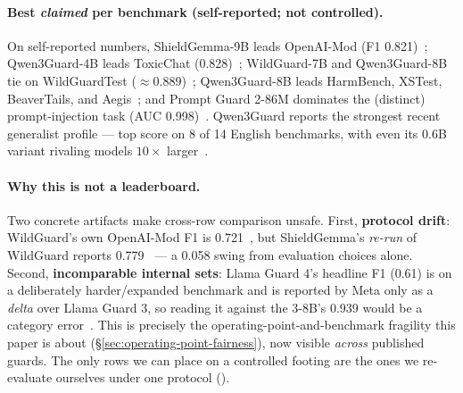 \paragraph{Best \emph{claimed} per benchmark (self-reported; not controlled).}
On self-reported numbers, ShieldGemma-9B leads OpenAI-Mod (F1 0.821)~\cite{zeng2024shieldgemma}; Qwen3Guard-4B leads ToxicChat (0.828)~\cite{qwen3guard2025}; WildGuard-7B and Qwen3Guard-8B tie on WildGuardTest ($\approx$0.889)~\cite{han2024wildguard,qwen3guard2025}; Qwen3Guard-8B leads HarmBench, XSTest, BeaverTails, and Aegis~\cite{qwen3guard2025}; and Prompt Guard 2-86M dominates the (distinct) prompt-injection task (AUC 0.998)~\cite{meta2025promptguard2}. Qwen3Guard reports the strongest recent generalist profile --- top score on 8 of 14 English benchmarks, with even its 0.6B variant rivaling models $10\times$ larger~\cite{qwen3guard2025}.

\paragraph{Why this is not a leaderboard.}
Two concrete artifacts make cross-row comparison unsafe. First, \textbf{protocol drift}: WildGuard's own OpenAI-Mod F1 is 0.721~\cite{han2024wildguard}, but ShieldGemma's \emph{re-run} of WildGuard reports 0.779~\cite{zeng2024shieldgemma} --- a 0.058 swing from evaluation choices alone. Second, \textbf{incomparable internal sets}: Llama Guard 4's headline F1 (0.61) is on a deliberately harder/expanded benchmark and is reported by Meta only as a \emph{delta} over Llama Guard 3, so reading it against the 3-8B's 0.939 would be a category error~\cite{meta2025llamaguard4}. This is precisely the operating-point-and-benchmark fragility this paper is about (\S\ref{sec:operating-point-fairness}), now visible \emph{across} published guards. The only rows we can place on a controlled footing are the ones we re-evaluate ourselves under one protocol ().
